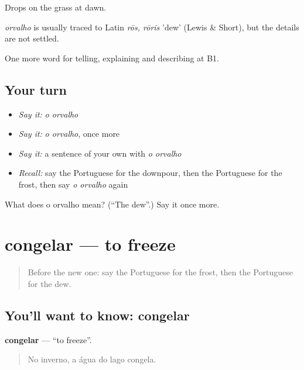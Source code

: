 Drops on the grass at dawn.

\begin{cousinweb}
\emph{orvalho} is usually traced to Latin \emph{rōs, rōris} 'dew' (Lewis \& Short), but the details are not settled.
\end{cousinweb}

\begin{grammarlens}[title={What you've built}]
One more word for telling, explaining and describing at B1.
\end{grammarlens}

\subsection*{Your turn}
\begin{itemize}
\raggedright
  \item \emph{Say it:} \emph{o orvalho}
  \item \emph{Say it:} \emph{o orvalho}, once more
  \item \emph{Say it:} a sentence of your own with \emph{o orvalho}
  \item \emph{Recall:} say the Portuguese for the downpour, then the Portuguese for the frost, then say \emph{o orvalho} again
\end{itemize}

\begin{tcolorbox}[breakable,colback=teal!4,colframe=teal!35!black,title={Before you move on}]
What does o orvalho mean? (\textquotedblleft{}The dew\textquotedblright{}.) Say it once more.
\end{tcolorbox}
\section[congelar]{congelar — to freeze}

\label{lesson:PT-C464-congelar}



\begin{quote}
Before the new one: say the Portuguese for the frost, then the Portuguese for the dew.
\end{quote}

\subsection*{You'll want to know: congelar}
\textbf{congelar} — \textquotedblleft{}to freeze\textquotedblright{}.

\begin{quote}
No inverno, a água do lago congela.
\end{quote}

